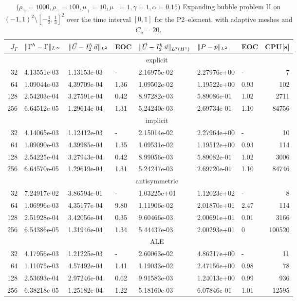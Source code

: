 \begin{table}
\center
\hspace*{-3.25cm}
\begin{tabular}{rllllllr}
\hline
$J_\Gamma$ & $\|\Gamma^h - \Gamma\|_{L^\infty}$ & $\|\vec U - I^h_{2}\,\vec u\|_{L^2}$ & EOC & $\|\vec U - I^h_{2}\,\vec u\|_{L^2(H^1)}$ & $\|P - p\|_{L^2}$ & EOC
& CPU[s] \\
\hline
& \multicolumn{7}{c}{explicit} \\
\hline
 32 & 4.13551e-03 & 1.13153e-03 &    - & 2.16975e-02 & 2.27976e+00 &    - &
7 \\
 64 & 1.09044e-03 & 4.39709e-04 & 1.36 & 1.09502e-02 & 1.19522e+00 & 0.93 &
102 \\
128 & 2.54203e-04 & 3.27591e-04 & 0.42 & 8.97282e-03 & 5.89086e-01 & 1.02 &
2711 \\
256 & 6.64512e-05 & 1.29614e-04 & 1.31 & 5.24240e-03 & 2.69734e-01 & 1.10 &
84756 \\
\hline
& \multicolumn{7}{c}{implicit} \\
\hline
 32 & 4.14065e-03 & 1.12412e-03 &    - & 2.15014e-02 & 2.27964e+00 &    - &
10 \\
 64 & 1.09090e-03 & 4.39985e-04 & 1.35 & 1.09531e-02 & 1.19512e+00 & 0.93 &
114 \\
128 & 2.54225e-04 & 3.27943e-04 & 0.42 & 8.99056e-03 & 5.89082e-01 & 1.02 &
3006 \\
256 & 6.64570e-05 & 1.29619e-04 & 1.31 & 5.24247e-03 & 2.69720e-01 & 1.10 &
84746 \\
\hline
& \multicolumn{7}{c}{antisymmetric} \\
\hline
 32 & 7.24917e-02 & 3.86594e-01 &    - & 1.03225e+01 & 1.12023e+02 &    - &
 8 \\
 64 & 1.06996e-03 & 4.35177e-04 & 9.80 & 1.11906e-02 & 2.01870e+01 & 2.47 &
114 \\
128 & 2.51928e-04 & 3.42056e-04 & 0.35 & 9.60466e-03 & 2.00691e+01 & 0.01 &
3166 \\
256 & 6.54386e-05 & 1.31946e-04 & 1.34 & 5.44437e-03 & 2.00293e+01 &    0 &
100520 \\
\hline
& \multicolumn{7}{c}{ALE} \\
\hline
 32 & 4.17956e-03 & 1.21225e-03 &    - & 2.60063e-02 & 4.86217e+00 &    - &
11 \\
 64 & 1.11075e-03 & 4.57492e-04 & 1.41 & 1.19033e-02 & 2.47156e+00 & 0.98 &
78 \\
128 & 2.53693e-04 & 2.97246e-04 & 0.62 & 9.91583e-03 & 1.24013e+00 & 0.99 &
936 \\
256 & 6.38218e-05 & 1.25182e-04 & 1.22 & 5.18160e-03 & 6.07846e-01 & 1.01 &
12595 \\
\hline
\end{tabular}
\hspace*{-3.25cm}
\caption[Navier--Stokes expanding bubble II errors P2--\pdg]
{($\rho_+ = 1000,\rho_- = 100,\mu_+ = 10,\mu_- =1,\gamma = 1,\alpha=0.15$)
Expanding bubble problem II on $(-1,1)^2\setminus[-\frac{1}{3},\frac{1}{3}]^2$
over the time interval $[0,1]$ for the P2--\pdg element, with adaptive
meshes and $C_a=20$\textdegree.}
\label{tab:nsexpandingbubbleIIp2p1dg}
\end{table}
